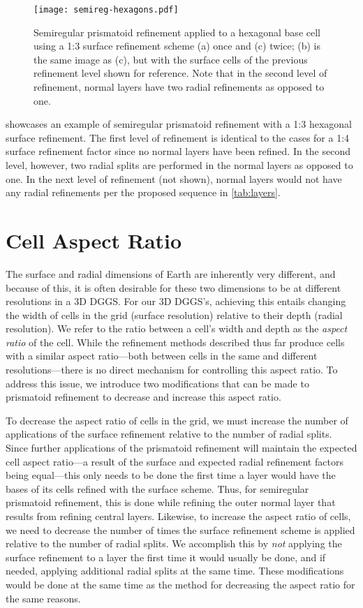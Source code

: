 \begin{figure}[ht!]
	\centering
	\texttt{[image: semireg-hexagons.pdf]}
	\caption[Semiregular prismatoid refinement for hexagons]{
		Semiregular prismatoid refinement applied to a hexagonal base cell using a 1:3 surface refinement scheme (a) once and (c) twice; (b) is the same image as (c), but with the surface cells of the previous refinement level shown for reference.
		Note that in the second level of refinement, normal layers have two radial refinements as opposed to one.
	}
	\label{fig:hexagons}
\end{figure}


 showcases an example of semiregular prismatoid refinement with a 1:3 hexagonal surface refinement.
The first level of refinement is identical to the cases for a 1:4 surface refinement factor since no normal layers have been refined.
In the second level, however, two radial splits are performed in the normal layers as opposed to one.
In the next level of refinement (not shown), normal layers would not have any radial refinements per the proposed sequence in \cref{tab:layers}.


\section{Cell Aspect Ratio} \label{chap:5:ar}
The surface and radial dimensions of Earth are inherently very different, and because of this, it is often desirable for these two dimensions to be at different resolutions in a 3D DGGS.
For our 3D DGGS's, achieving this entails changing the width of cells in the grid (surface resolution) relative to their depth (radial resolution).
We refer to the ratio between a cell's width and depth as the \textit{aspect ratio} of the cell.
While the refinement methods described thus far produce cells with a similar aspect ratio---both between cells in the same and different resolutions---there is no direct mechanism for controlling this aspect ratio.
To address this issue, we introduce two modifications that can be made to prismatoid refinement to decrease and increase this aspect ratio.


To decrease the aspect ratio of cells in the grid, we must increase the number of applications of the surface refinement relative to the number of radial splits.
Since further applications of the prismatoid refinement will maintain the expected cell aspect ratio---a result of the surface and expected radial refinement factors being equal---this only needs to be done the first time a layer would have the bases of its cells refined with the surface scheme.
Thus, for semiregular prismatoid refinement, this is done while refining the outer normal layer that results from refining central layers. Likewise, to increase the aspect ratio of cells, we need to decrease the number of times the surface refinement scheme is applied relative to the number of radial splits.
We accomplish this by \textit{not} applying the surface refinement to a layer the first time it would usually be done, and if needed, applying additional radial splits at the same time.
These modifications would be done at the same time as the method for decreasing the aspect ratio for the same reasons.


